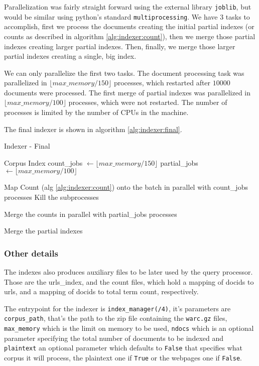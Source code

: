 \documentclass[sigconf,authorversion,nonacm]{acmart}
\def\code#1{\texttt{#1}}
\begin{document}
Parallelization was fairly straight forward using the external library \code{joblib}, but would be similar using python's standard \code{multiprocessing}. We have 3 tasks to accomplish, first we process the documents creating the initial partial indexes (or counts as described in algorithm \ref{alg:indexer:count}), then we merge those partial indexes creating larger partial indexes. Then, finally, we merge those larger partial indexes creating a single, big index.

We can only parallelize the first two tasks. The document processing task was parallelized in $\lfloor max\_memory/150\rfloor$ processes, which restarted after $10000$ documents were processed. The first merge of partial indexes was parallelized in $\lfloor max\_memory/100 \rfloor$ processes, which were not restarted. The number of processes is limited by the number of CPUs in the machine.

The final indexer is shown in algorithm \ref{alg:indexer:final}.

\begin{algorithm}
  \caption{Indexer - Final}\label{alg:indexer:final}
  \begin{algorithmic}
    \Require Corpus
    \Ensure Index
    \State count\_jobs $\gets \lfloor max\_memory/150\rfloor$
    \State partial\_jobs $\gets \lfloor max\_memory/100\rfloor$

    \State Map Count (alg \ref{alg:indexer:count}) onto the batch in parallel with count\_jobs processes
    \State Kill the subprocesses
    \EndFor

    \State Merge the counts in parallel with partial\_jobs processes

    \State Merge the partial indexes

  \end{algorithmic}
\end{algorithm}

\subsubsection{Other details} The indexes also produces auxiliary files to be later used by the query processor. Those are the urls\_index, and the count files, which hold a mapping of docids to urls, and a mapping of docids to total term count, respectively.

The entrypoint for the indexer is \code{index\_manager(/4)}, it's parameters are \code{corpus\_path}, that's the path to the zip file containing the \code{warc.gz} files, \code{max\_memory} which is the limit on memory to be used, \code{ndocs} which is an optional parameter specifying the total number of documents to be indexed and \code{plaintext} an optional parameter which defaults to \code{False} that specifies what corpus it will process, the plaintext one if \code{True} or the webpages one if \code{False}.
\end{document}
